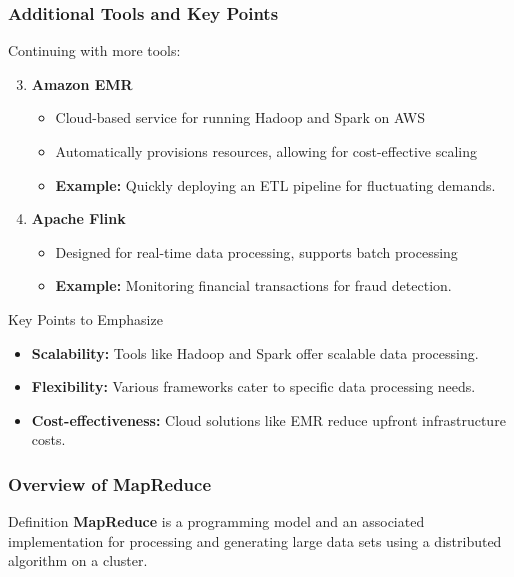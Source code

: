 \documentclass[aspectratio=169]{beamer}
\begin{document}
\begin{frame}[fragile]
    \frametitle{Additional Tools and Key Points}

    Continuing with more tools:
    
    \begin{enumerate}
        \setcounter{enumi}{2}
        \item \textbf{Amazon EMR}
        \begin{itemize}
            \item Cloud-based service for running Hadoop and Spark on AWS
            \item Automatically provisions resources, allowing for cost-effective scaling
            \item \textbf{Example:} Quickly deploying an ETL pipeline for fluctuating demands.
        \end{itemize}
        
        \item \textbf{Apache Flink}
        \begin{itemize}
            \item Designed for real-time data processing, supports batch processing
            \item \textbf{Example:} Monitoring financial transactions for fraud detection.
        \end{itemize}
    \end{enumerate}

    \begin{block}{Key Points to Emphasize}
    \begin{itemize}
        \item \textbf{Scalability:} Tools like Hadoop and Spark offer scalable data processing.
        \item \textbf{Flexibility:} Various frameworks cater to specific data processing needs.
        \item \textbf{Cost-effectiveness:} Cloud solutions like EMR reduce upfront infrastructure costs.
    \end{itemize}
    \end{block}
    
\end{frame}

\begin{frame}[fragile]
    \frametitle{Overview of MapReduce}
    \begin{block}{Definition}
        \textbf{MapReduce} is a programming model and an associated implementation for processing and generating large data sets using a distributed algorithm on a cluster.
    \end{block}
\end{frame}
\end{document}
